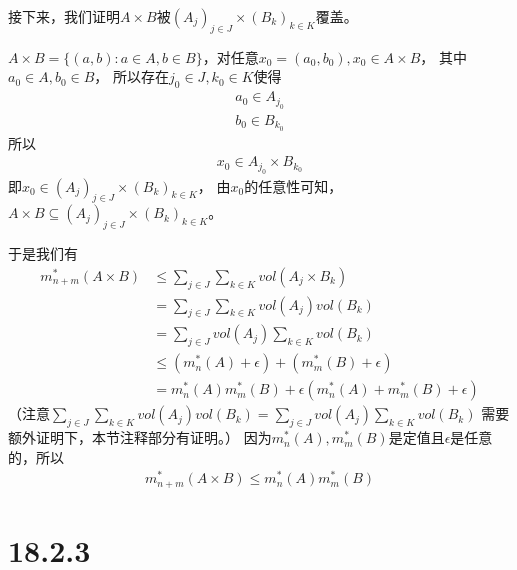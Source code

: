 \documentclass{article}
\begin{document}
接下来，我们证明$A \times B$被$(A_j)_{j \in J} \times (B_k)_{k \in K}$覆盖。

$A \times B = \{(a, b): a \in A, b \in B\}$，对任意$x_0 = (a_0, b_0), x_0 \in A \times B$，
其中$a_0 \in A, b_0 \in B$，
所以存在$j_0 \in J, k_0 \in K$使得
\begin{align*}
  a_0 \in A_{j_0} \\
  b_0 \in B_{k_0}
\end{align*}
所以
\begin{align*}
  x_0 \in A_{j_0} \times B_{k_0}
\end{align*}
即$x_0 \in (A_j)_{j \in J} \times (B_k)_{k \in K}$，
由$x_0$的任意性可知，$A \times B \subseteq (A_j)_{j \in J} \times (B_k)_{k \in K}$。

于是我们有
\begin{align*}
  m^{\ast}_{n + m}(A \times B)
   & \leq \sum\limits_{j \in J} \sum\limits_{k \in K} vol(A_j \times B_k)                      \\
   & = \sum\limits_{j \in J} \sum\limits_{k \in K} vol(A_j)vol(B_k)                            \\
   & = \sum\limits_{j \in J} vol(A_j) \sum\limits_{k \in K} vol(B_k)                           \\
   & \leq (m^{\ast}_{n}(A) + \epsilon) + (m^{\ast}_{m}(B) + \epsilon)                          \\
   & = m^{\ast}_{n}(A)m^{\ast}_{m}(B) + \epsilon(m^{\ast}_{n}(A) + m^{\ast}_{m}(B) + \epsilon)
\end{align*}
（注意$\sum\limits_{j \in J} \sum\limits_{k \in K} vol(A_j)vol(B_k) = \sum\limits_{j \in J} vol(A_j) \sum\limits_{k \in K} vol(B_k)$
需要额外证明下，本节注释部分有证明。）
因为$m^{\ast}_{n}(A), m^{\ast}_{m}(B)$是定值且$\epsilon$是任意的，所以
\begin{align*}
  m^{\ast}_{n + m}(A \times B) \leq m^{\ast}_{n}(A)m^{\ast}_{m}(B)
\end{align*}

\section*{18.2.3}
\end{document}
